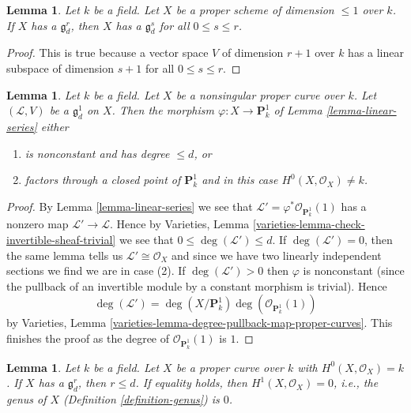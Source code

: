 \documentclass{stacks-project}
\theoremstyle{plain}
\newtheorem{lemma}[subsection]{Lemma}
\theoremstyle{definition}
\theoremstyle{remark}
\numberwithin{equation}{subsection}
\begin{document}
\begin{lemma}
\label{lemma-linear-series-trivial-existence}
Let $k$ be a field. Let $X$ be a proper scheme of dimension $\leq 1$ over $k$.
If $X$ has a $\mathfrak g^r_d$, then $X$ has a $\mathfrak g^s_d$ for
all $0 \leq s \leq r$.
\end{lemma}

\begin{proof}
This is true because a vector space $V$ of dimension $r + 1$
over $k$ has a linear subspace of dimension $s + 1$ for all
$0 \leq s \leq r$.
\end{proof}

\begin{lemma}
\label{lemma-g1d}
Let $k$ be a field. Let $X$ be a nonsingular proper curve over $k$.
Let $(\mathcal{L}, V)$ be a $\mathfrak g^1_d$ on $X$. Then the morphism
$\varphi : X \to \mathbf{P}^1_k$ of Lemma \ref{lemma-linear-series}
either
\begin{enumerate}
\item is nonconstant and has degree $\leq d$, or
\item factors through a closed point of $\mathbf{P}^1_k$ and in this
case $H^0(X, \mathcal{O}_X) \not = k$.
\end{enumerate}
\end{lemma}

\begin{proof}
By Lemma \ref{lemma-linear-series} we see that
$\mathcal{L}' = \varphi^*\mathcal{O}_{\mathbf{P}^1_k}(1)$
has a nonzero map $\mathcal{L}' \to \mathcal{L}$.
Hence by Varieties, Lemma \ref{varieties-lemma-check-invertible-sheaf-trivial}
we see that $0 \leq \deg(\mathcal{L}') \leq d$.
If $\deg(\mathcal{L}') = 0$, then the same lemma tells us
$\mathcal{L}' \cong \mathcal{O}_X$ and since we have
two linearly independent sections we find we are in case (2).
If $\deg(\mathcal{L}') > 0$ then $\varphi$ is nonconstant (since the
pullback of an invertible module by a constant morphism is trivial).
Hence
$$
\deg(\mathcal{L}') =
\deg(X/\mathbf{P}^1_k) \deg(\mathcal{O}_{\mathbf{P}^1_k}(1))
$$
by Varieties, Lemma \ref{varieties-lemma-degree-pullback-map-proper-curves}.
This finishes the proof as the degree of
$\mathcal{O}_{\mathbf{P}^1_k}(1)$ is $1$.
\end{proof}

\begin{lemma}
\label{lemma-grd-inequalities}
Let $k$ be a field. Let $X$ be a proper curve over $k$ with
$H^0(X, \mathcal{O}_X) = k$. If $X$ has a $\mathfrak g^r_d$, then
$r \leq d$. If equality holds, then $H^1(X, \mathcal{O}_X) = 0$, i.e.,
the genus of $X$ (Definition \ref{definition-genus}) is $0$.
\end{lemma}
\end{document}
